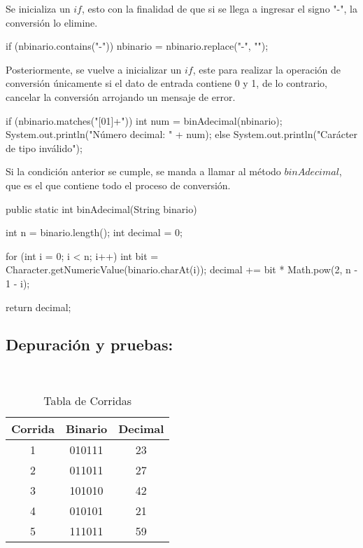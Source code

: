 Se inicializa un $if$, esto con la finalidad de que si se llega a ingresar el signo "-", la conversión lo elimine.

\begin{javaCode}

if (nbinario.contains("-")) {
    nbinario = nbinario.replace("-", "");
    }

\end{javaCode}

Posteriormente, se vuelve a inicializar un $if$, este para realizar la operación de conversión únicamente si el dato de entrada contiene 0 y 1, de lo contrario, cancelar la conversión arrojando un mensaje de error.

\begin{javaCode}

if (nbinario.matches("[01]+")) {
    int num = binAdecimal(nbinario);
    System.out.println("Número decimal: " + num);
    }else{
        System.out.println("Carácter de tipo inválido");
    }
\end{javaCode}

Si la condición anterior se cumple, se manda a llamar al método $binAdecimal$, que es el que contiene todo el proceso de conversión.
\begin{javaCode}

public static int binAdecimal(String binario) {
    int n = binario.length();
    int decimal = 0;
       
    for (int i = 0; i < n; i++) {
        int bit = Character.getNumericValue(binario.charAt(i));
    decimal += bit * Math.pow(2, n - 1 - i);
    }

    return decimal;
}
    
\end{javaCode}

\subsection{\textbf{Depuración y pruebas:}}

\begin{table}[h!]
     \centering
     \caption{Tabla de Corridas}\\
     
     \begin{tabular}{|c|c|c|}
     \hline
        Corrida & Binario & Decimal\\
        \hline
        1  & 010111 & 23\\
        \hline
        2  & 011011 & 27\\
        \hline
        3  & 101010 & 42\\
        \hline
        4  & 010101 & 21\\
        \hline
        5  & 111011 & 59\\
        \hline
     \end{tabular}
     \label{tab:my_label}
 \end{table}
\vspace*{-8pt}